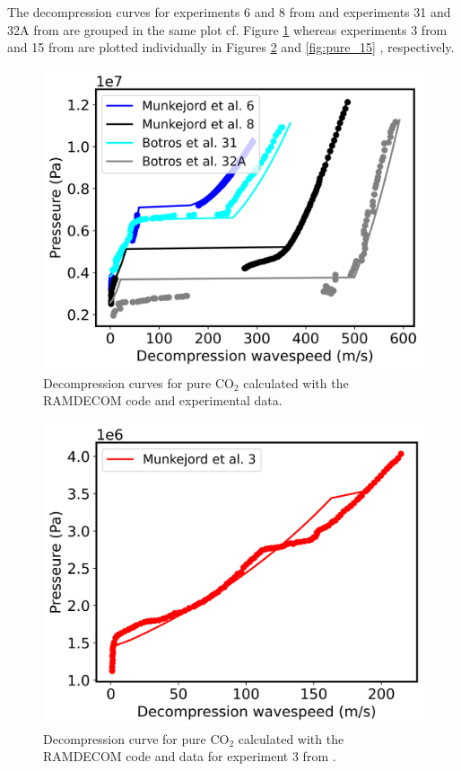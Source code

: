 \documentclass[a4paper, 10pt, twocolumn, twoside]{scrartcl}
\begin{document}
The decompression curves for experiments 6 and 8 from \cite{MUNKEJORD2020118560} and experiments 31 and 32A from \cite{Botros_pure} are grouped in the same plot cf. Figure \ref{fig:pure_combined} whereas experiments 3 from \cite{MUNKEJORD2020118560} and 15 from \cite{Botros_pure} are plotted individually in Figures \ref{fig:pure_3} and \ref{fig:pure_15} , respectively.
 
\begin{figure}[!ht]
	\centering
	\includegraphics[width=\columnwidth]{./Bilder/pure_combined.png}
	\caption{Decompression curves for pure CO$_2$ calculated with the RAMDECOM code and experimental data.}
	\label{fig:pure_combined}
\end{figure}

\begin{figure}[!ht]
	\centering
	\includegraphics[width=\columnwidth]{./Bilder/pure_0.png}
	\caption{Decompression curve for pure CO$_2$  calculated with the RAMDECOM code and data for experiment 3 from \cite{MUNKEJORD2020118560}.}
	\label{fig:pure_3}
\end{figure}
\end{document}
